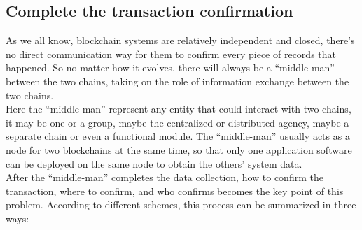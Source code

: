 \subsection{Complete the transaction confirmation}
\noindent As we all know, blockchain systems are relatively independent and closed, there's no direct communication way for them to confirm every piece of records that happened. So no matter how it evolves, there will always be a ``middle-man'' between the two chains, taking on the role of information exchange between the two chains.\\
\noindent Here the ``middle-man'' represent any entity that could interact with two chains, it may be one or a group, maybe the centralized or distributed agency, maybe a separate chain or even a functional module. The ``middle-man'' usually acts as a node for two blockchains at the same time, so that only one application software can be deployed on the same node to obtain the others' system data.\\
\noindent After the ``middle-man'' completes the data collection, how to confirm the transaction, where to confirm, and who confirms becomes the key point of this problem. According to different schemes, this process can be summarized in three ways:
